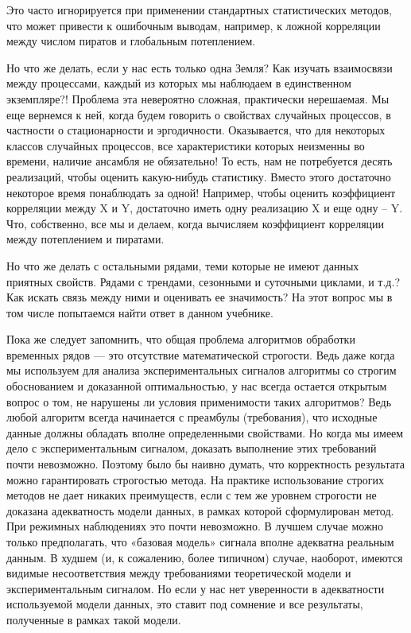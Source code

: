 Это часто игнорируется при применении
стандартных статистических методов, что может привести к ошибочным
выводам, например, к ложной корреляции между числом пиратов и
глобальным потеплением.

Но что же делать, если у нас есть только одна Земля? Как изучать
взаимосвязи между процессами, каждый из которых мы наблюдаем в
единственном экземпляре?! Проблема эта невероятно сложная,
практически нерешаемая. Мы еще вернемся к ней, когда будем говорить
о свойствах случайных процессов, в частности о стационарности и эргодичности.
Оказывается, что для некоторых классов случайных
процессов, все характеристики которых неизменны во времени, наличие
ансамбля не обязательно! То есть, нам не потребуется десять
реализаций, чтобы оценить какую-нибудь статистику. Вместо этого
достаточно некоторое время понаблюдать за одной! Например, чтобы
оценить коэффициент корреляции между X и Y, достаточно иметь одну
реализацию X и еще одну – Y. Что, собственно, все мы и делаем,
когда вычисляем коэффициент корреляции между потеплением и
пиратами.

Но что же делать с остальными рядами, теми которые не имеют данных
приятных свойств. Рядами с трендами, сезонными и суточными
циклами, и т.д.? Как искать связь между ними и оценивать ее
значимость? На этот вопрос мы в том числе попытаемся найти ответ в
данном учебнике.

Пока же следует запомнить, что общая проблема алгоритмов обработки
временных рядов — это отсутствие математической строгости. Ведь даже когда
мы используем для анализа экспериментальных сигналов алгоритмы со
строгим обоснованием и доказанной оптимальностью, у нас всегда
остается открытым вопрос о том, не нарушены ли условия применимости
таких алгоритмов? Ведь любой алгоритм всегда начинается с преамбулы
(требования), что исходные данные должны обладать вполне
определенными свойствами. Но когда мы имеем дело с
экспериментальным сигналом, доказать выполнение этих требований
почти невозможно. Поэтому было бы наивно думать, что корректность
результата можно гарантировать строгостью метода. На практике
использование строгих методов не дает никаких преимуществ, если с
тем же уровнем строгости не доказана адекватность модели данных, в
рамках которой сформулирован метод. При режимных наблюдениях это
почти невозможно. В лучшем случае можно только предполагать, что
«базовая модель» сигнала вполне адекватна реальным данным. В худшем
(и, к сожалению, более типичном) случае, наоборот, имеются видимые
несоответствия между требованиями теоретической модели и
экспериментальным сигналом. Но если у нас нет уверенности в
адекватности используемой модели данных, это ставит под сомнение и
все результаты, полученные в рамках такой модели.

